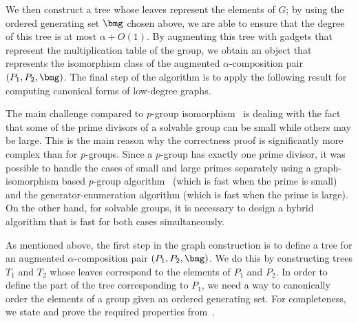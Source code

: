 We then construct a tree whose leaves represent the elements of $G$; by using the ordered generating set $\bmg$ chosen above, we are able to ensure that the degree of this tree is at most $\alpha + O(1)$.  By augmenting this tree with gadgets that represent the multiplication table of the group, we obtain an object that represents the isomorphism class of the augmented $\alpha$-composition pair $(P_1, P_2, \bmg)$.  The final step of the algorithm is to apply the following result for computing canonical forms of low-degree graphs.


The main challenge compared to $p$-group isomorphism~\cite{rosenbaum2013c} is dealing with the fact that some of the prime divisors of a solvable group can be small while others may be large.  This is the main reason why the correctness proof is significantly more complex than for $p$-groups.  Since a $p$-group has exactly one prime divisor, it was possible to handle the cases of small and large primes separately using a graph-isomorphism based $p$-group algorithm~\cite{rosenbaum2013c} (which is fast when the prime is small) and the generator-enumeration algorithm (which is fast when the prime is large).  On the other hand, for solvable groups, it is necessary to design a hybrid algorithm that is fast for both cases simultaneously.

As mentioned above, the first step in the graph construction is to define a tree for an augmented $\alpha$-composition pair $(P_1, P_2, \bmg)$.  We do this by constructing trees $T_1$ and $T_2$ whose leaves correspond to the elements of $P_1$ and $P_2$.  In order to define the part of the tree corresponding to $P_1$, we need a way to canonically order the elements of a group given an ordered generating set.  For completeness, we state and prove the required properties from~\cite{rosenbaum2013c}.

